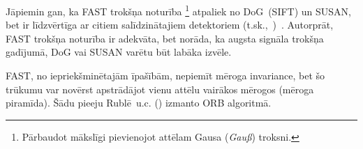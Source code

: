 Jāpiemin gan, ka FAST trokšņa noturība%
	\footnote{Pārbaudot mākslīgi pievienojot attēlam Gausa (\textit{Gauß}) troksni.}
atpaliek no DoG~(SIFT) un SUSAN, bet ir līdzvērtīga ar citiem
salīdzinātajiem detektoriem (t.sk.,~)~\cite{FAST}.
Autorprāt, FAST trokšņa noturība ir adekvāta, bet norāda, ka augsta signāla
trokšņa gadījumā, DoG vai SUSAN varētu būt labāka izvēle.

FAST, no iepriekšminētajām īpašībām, nepiemīt mēroga invariance, bet šo
trūkumu var novērst apstrādājot vienu attēlu vairākos mērogos (mēroga piramīda).
Šādu pieeju Rublē~u.c.\cite{ORB} () izmanto ORB algoritmā.

